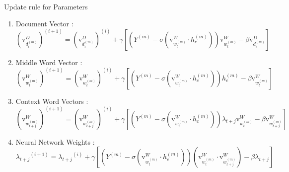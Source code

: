 \documentclass[10pt]{beamer}
\newcommand{\vecdi}[1]{\ensuremath{\mathrm{v}^{D}_{#1}}}
\newcommand{\vecwi}[1]{\ensuremath{\mathrm{v}^{W}_{#1}}}
\newcommand{\wgt}[1]{\ensuremath{\lambda_{#1}}}
\begin{document}
\begin{frame}{Update rule for Parameters}

\begin{enumerate}
	\vfill\item<1-> Document Vector : 
		\scriptsize{ \begin{equation}
				(\vecdi{d^{(m)}_{i}})^{(i+1)} = (\vecdi{d^{(m)}_{i}})^{(i)} + \gamma \left[ (Y^{(m)} - \sigma(\vecwi{w^{(m)}_{t}} \cdot h^{(m)}_{c}) )\vecwi{w^{(m)}_{t}} - \beta\vecdi{d^{(m)}_{i}} \right]
		\end{equation} }
	\vfill\item<2-> Middle Word Vector : 	
		\scriptsize{ \begin{equation}
			(\vecwi{w^{(m)}_{t}})^{(i+1)} = (\vecwi{w^{(m)}_{t}})^{(i)} + \gamma \left[ (Y^{(m)} - \sigma(\vecwi{w^{(m)}_{t}} \cdot h^{(m)}_{c})) h^{(m)}_{c} - \beta\vecwi{w^{(m)}_{t}} \right]
		\end{equation} }
	\vfill\item<3-> Context Word Vectors : 		
		\scriptsize{	\begin{equation}
			(\vecwi{w^{(m)}_{t+j}})^{(i+1)} = (\vecwi{w^{(m)}_{t+j}})^{(i)} + \gamma \left[(Y^{(m)} - \sigma(\vecwi{w^{(m)}_{t}} \cdot h^{(m)}_{c}))\wgt{t+j} \vecwi{w^{(m)}_{t}} - \beta\vecwi{w^{(m)}_{t+j}} \right]
		\end{equation} }
	\vfill\item<4-> Neural Network Weights : 		
		\scriptsize{	\begin{equation}
			\wgt{t+j}^{(i+1)} = \wgt{t+j}^{(i)} + \gamma \left[ (Y^{(m)} - \sigma(\vecwi{w^{(m)}_{t}} \cdot h^{(m)}_{c}))(\vecwi{w^{(m)}_{t}} \cdot \vecwi{w^{(m)}_{t+j}}) -\beta\wgt{t+j} \right]
		\end{equation} }
\end{enumerate}
\end{frame}

\end{document}
